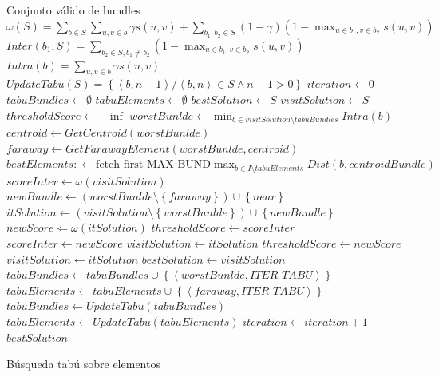\begin{algorithm}[H]
\begin{algorithmic}[1]
\ENSURE Conjunto válido de bundles
\STATE $\omega(S) = \sum_{b \in S}{\sum_{u,v \in b}{\gamma s(u,v)}} + \sum_{b_1,b_2 \in S}{(1-\gamma) (1-\max_{u \in b_1, v \in b_2}{s(u,v)})}$
\STATE $Inter(b_1, S) = \sum_{b_2 \in S, b_1\neq b_2}{(1-\max_{u \in b_1, v \in b_2}{s(u,v)})}$
\STATE $Intra(b) = \sum_{u,v \in b}{\gamma s(u,v)}$
\STATE $UpdateTabu(S) = \left\{ \left\langle b, n-1 \right\rangle  / \left\langle b, n \right\rangle \in S \wedge n-1 > 0 \right\}$
\STATE $iteration \leftarrow 0$
\STATE $tabuBundles \leftarrow \emptyset$
\STATE $tabuElements \leftarrow \emptyset$
\STATE $bestSolution \leftarrow S$
\STATE $visitSolution \leftarrow S$
\STATE $thresholdScore \leftarrow -\inf$
  \STATE $worstBunlde \leftarrow \min_{b \in visitSolution \setminus tabuBundles}{Intra(b)}$
  \STATE $centroid \leftarrow GetCentroid(worstBunlde)$
  \STATE $faraway \leftarrow GetFarawayElement(worstBunlde,centroid)$
  \STATE $bestElements: \leftarrow \text{fetch first MAX\_BUND} \max_{b \in I \setminus tabuElements}{Dist(b, centroidBundle)}$
	\STATE $scoreInter \leftarrow \omega(visitSolution)$
		\STATE $newBundle \leftarrow (worstBunlde \setminus \left\{faraway\right\})\cup\left\{near\right\}$
		\STATE $itSolution \leftarrow (visitSolution \setminus \left\{worstBunlde\right\}) \cup \left\{newBundle\right\}$
    \STATE $newScore \Leftarrow \omega(itSolution)$
			\STATE $thresholdScore \leftarrow scoreInter$
			\STATE $scoreInter \leftarrow newScore$
			\STATE $visitSolution \leftarrow itSolution$
				\STATE $thresholdScore \leftarrow newScore$
				\STATE $visitSolution \leftarrow itSolution$
    \ENDIF
  \ENDFOR
		\STATE $bestSolution \leftarrow visitSolution$
  \ENDIF
	\STATE $tabuBundles \leftarrow tabuBundles \cup \left\{
	\left\langle worstBunlde, ITER\_TABU \right\rangle\right\}$
  \STATE $tabuElements \leftarrow tabuElements \cup \left\{
	\left\langle faraway, ITER\_TABU \right\rangle\right\}$
	\STATE $tabuBundles \leftarrow UpdateTabu(tabuBundles)$
  \STATE $tabuElements \leftarrow UpdateTabu(tabuElements)$
	\STATE $iteration \leftarrow iteration + 1$
\ENDWHILE
\RETURN $bestSolution$
\end{algorithmic}
\caption{Búsqueda tabú sobre elementos}\label{alg:algBusTabuIntra}
\end{algorithm}
